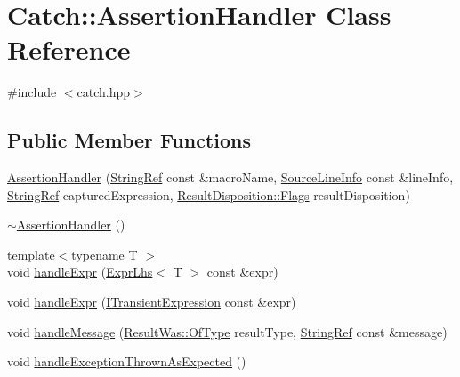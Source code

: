 \hypertarget{class_catch_1_1_assertion_handler}{}\section{Catch\+:\+:Assertion\+Handler Class Reference}
\label{class_catch_1_1_assertion_handler}


{\ttfamily \#include $<$catch.\+hpp$>$}

\subsection*{Public Member Functions}
\begin{DoxyCompactItemize}
\item 
\mbox{\hyperlink{class_catch_1_1_assertion_handler_a32efbb1b56b71d758d4c2094bac1f1a9}{Assertion\+Handler}} (\mbox{\hyperlink{class_catch_1_1_string_ref}{String\+Ref}} const \&macro\+Name, \mbox{\hyperlink{struct_catch_1_1_source_line_info}{Source\+Line\+Info}} const \&line\+Info, \mbox{\hyperlink{class_catch_1_1_string_ref}{String\+Ref}} captured\+Expression, \mbox{\hyperlink{struct_catch_1_1_result_disposition_a3396cad6e2259af326b3aae93e23e9d8}{Result\+Disposition\+::\+Flags}} result\+Disposition)
\item 
\mbox{\hyperlink{class_catch_1_1_assertion_handler_a1e839d810f6ac0fa6d127fe8350175ed}{$\sim$\+Assertion\+Handler}} ()
\item 
{\footnotesize template$<$typename T $>$ }\\void \mbox{\hyperlink{class_catch_1_1_assertion_handler_a2ef387e567bad90ec6e4b5bf5c367388}{handle\+Expr}} (\mbox{\hyperlink{class_catch_1_1_expr_lhs}{Expr\+Lhs}}$<$ T $>$ const \&expr)
\item 
void \mbox{\hyperlink{class_catch_1_1_assertion_handler_afe14d9cf1b1c7f70dae439fbdb51d0c4}{handle\+Expr}} (\mbox{\hyperlink{struct_catch_1_1_i_transient_expression}{I\+Transient\+Expression}} const \&expr)
\item 
void \mbox{\hyperlink{class_catch_1_1_assertion_handler_abdb4c180ed83ec2858b2fb87712c516d}{handle\+Message}} (\mbox{\hyperlink{struct_catch_1_1_result_was_a624e1ee3661fcf6094ceef1f654601ef}{Result\+Was\+::\+Of\+Type}} result\+Type, \mbox{\hyperlink{class_catch_1_1_string_ref}{String\+Ref}} const \&message)
\item 
void \mbox{\hyperlink{class_catch_1_1_assertion_handler_ab6caf765764a4064e90fce829eec201d}{handle\+Exception\+Thrown\+As\+Expected}} ()
\item 

\end{DoxyCompactItemize}
